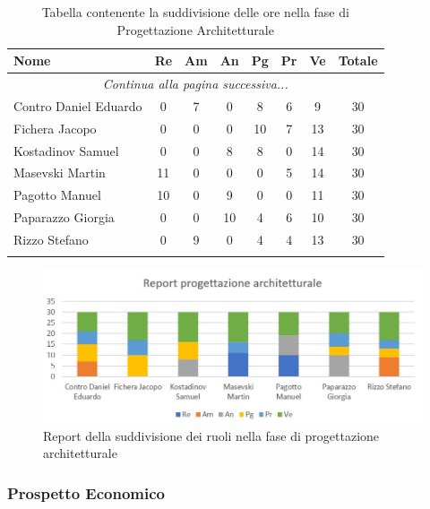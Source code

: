 \documentclass[../piano_di_progetto.tex]{subfiles}
\begin{document}
\begin{center}
	\begin{longtable}{|l|c|c|c|c|c|c|c|}
		\hline
		\rowcolor{lightgray}
		\textbf{Nome} & \textbf{Re} & \textbf{Am} & \textbf{An} & \textbf{Pg}  & \textbf{Pr}   & \textbf{Ve} & \textbf{Totale} \\
		\hline
		\endhead
		
		\hline
		\multicolumn{8}{|c|}{\emph{Continua alla pagina successiva...}}\\
		\hline
		\endfoot

		\endlastfoot
		
		\hline
			Contro Daniel Eduardo & 0 & 7 & 0 & 8 & 6 & 9 & 30\\
			Fichera Jacopo & 0 & 0 & 0 & 10 & 7 & 13 & 30 \\
			Kostadinov Samuel & 0 & 0 & 8 & 8 & 0 & 14 & 30 \\			
			Masevski Martin 	& 11 & 0 & 0 & 0 & 5 & 14 & 30\\
			Pagotto Manuel & 10 & 0 & 9 & 0 & 0 & 11 & 30 \\			
			Paparazzo Giorgia & 0 & 0 & 10 & 4 & 6 & 10 & 30 \\
			Rizzo Stefano & 0 & 9 & 0 & 4 & 4 & 13 & 30\\
		\hline	
		\rowcolor{white}
		\caption{Tabella contenente la suddivisione delle ore nella fase di Progettazione Architetturale}
	\end{longtable}
\end{center}

\begin{figure}[H]
\centering
\includegraphics[width=12cm]{img/report_prog_arc}
\caption{Report della suddivisione dei ruoli nella fase di progettazione architetturale}
\end{figure}

\subsubsection{Prospetto Economico}
\end{document}
